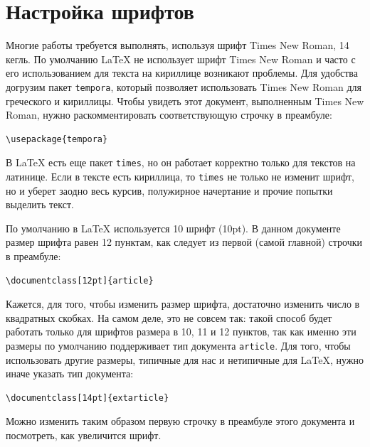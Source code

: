 \documentclass[12pt]{article}
\begin{document}
\section{Настройка шрифтов}

Многие работы требуется выполнять, используя шрифт Times New Roman, 14 кегль. По умолчанию \LaTeX{} не использует шрифт Times New Roman и часто с его использованием для текста на кириллице возникают проблемы. Для удобства догрузим пакет \texttt{tempora}, который позволяет использовать Times New Roman для греческого и кириллицы. Чтобы увидеть этот документ, выполненным Times New Roman, нужно раскомментировать соответствующую строчку в преамбуле:

\begin{center}
\begin{BVerbatim}
\usepackage{tempora}
\end{BVerbatim} 
\end{center}


В \LaTeX{} есть еще пакет \texttt{times}, но он работает корректно только для текстов на латинице. Если в тексте есть кириллица, то \texttt{times} не только не изменит шрифт, но и уберет заодно весь курсив, полужирное начертание и прочие попытки выделить текст.

По умолчанию в \LaTeX{} используется 10 шрифт (10pt). В данном документе размер шрифта равен 12 пунктам, как следует из первой (самой главной) строчки в преамбуле:

\begin{center}
\begin{BVerbatim}
\documentclass[12pt]{article}
\end{BVerbatim} 
\end{center}

Кажется, для того, чтобы изменить размер шрифта, достаточно изменить число в квадратных скобках. На самом деле, это не совсем так: такой способ будет работать только для шрифтов размера в 10, 11 и 12 пунктов, так как именно эти размеры по умолчанию поддерживает тип документа \texttt{article}. Для того, чтобы использовать другие размеры, типичные для нас и нетипичные для \LaTeX{}, нужно иначе указать тип документа:

\begin{center}
\begin{BVerbatim}
\documentclass[14pt]{extarticle}
\end{BVerbatim} 
\end{center}

Можно изменить таким образом первую строчку в преамбуле этого документа и посмотреть, как увеличится шрифт.
\end{document}

